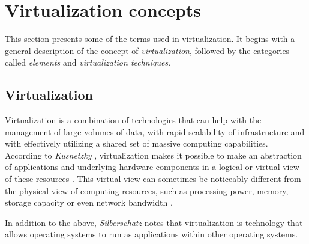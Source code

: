 	\section {Virtualization concepts}\label{sec:concetposVirtualizacion}	
	
	This section presents some of the terms used in virtualization. 
	It begins with a general description of the concept of \textit{virtualization}, followed by the categories called \textit{elements} and \textit{virtualization techniques}.
	
	\subsection{Virtualization}
	
	Virtualization is a combination of technologies that can help with the management of large volumes of data, with rapid scalability of infrastructure and with effectively utilizing a shared set of massive computing capabilities. According to \textit{Kusnetzky} \cite{Kusnetzky2011}, virtualization makes it possible to make an abstraction of applications and underlying hardware components in a logical or virtual view of these resources \cite{AbdElRahem2016}. This virtual view can sometimes be noticeably different from the physical view of computing resources, such as processing power, memory, storage capacity or even network bandwidth \cite{Stallings2015}.
	
	In addition to the above, \textit{Silberschatz} \cite{Silberschatz2014} notes that virtualization is technology that allows operating systems to run as applications within other operating systems.
	
	
	
	
